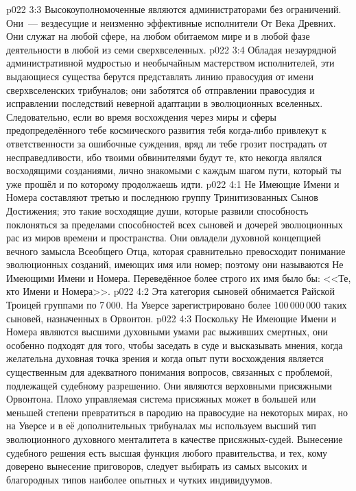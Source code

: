 \vs p022 3:3 Высокоуполномоченные являются администраторами без ограничений. Они~--- вездесущие и неизменно эффективные исполнители От Века Древних. Они служат на любой сфере, на любом обитаемом мире и в любой фазе деятельности в любой из семи сверхвселенных.
\vs p022 3:4 Обладая незаурядной административной мудростью и необычайным мастерством исполнителей, эти выдающиеся существа берутся представлять линию правосудия от имени сверхвселенских трибуналов; они заботятся об отправлении правосудия и исправлении последствий неверной адаптации в эволюционных вселенных. Следовательно, если во время восхождения через миры и сферы предопределённого тебе космического развития тебя когда\hyp{}либо привлекут к ответственности за ошибочные суждения, вряд ли тебе грозит пострадать от несправедливости, ибо твоими обвинителями будут те, кто некогда являлся восходящими созданиями, лично знакомыми с каждым шагом пути, который ты уже прошёл и по которому продолжаешь идти.
\vs p022 4:1 Не Имеющие Имени и Номера составляют третью и последнюю группу Тринитизованных Сынов Достижения; это такие восходящие души, которые развили способность поклоняться за пределами способностей всех сыновей и дочерей эволюционных рас из миров времени и пространства. Они овладели духовной концепцией вечного замысла Всеобщего Отца, которая сравнительно превосходит понимание эволюционных созданий, имеющих имя или номер; поэтому они называются Не Имеющими Имени и Номера. Переведённое более строго их имя было бы: <<Те, кто  Имени и Номера>>.
\vs p022 4:2 Эта категория сыновей обнимается Райской Троицей группами по 7\,000. На Уверсе зарегистрировано более 100\,000\,000 таких сыновей, назначенных в Орвонтон.
\vs p022 4:3 Поскольку Не Имеющие Имени и Номера являются высшими духовными умами рас выживших смертных, они особенно подходят для того, чтобы заседать в суде и высказывать мнения, когда желательна духовная точка зрения и когда опыт пути восхождения является существенным для адекватного понимания вопросов, связанных с проблемой, подлежащей судебному разрешению. Они являются верховными присяжными Орвонтона. Плохо управляемая система присяжных может в большей или меньшей степени превратиться в пародию на правосудие на некоторых мирах, но на Уверсе и в её дополнительных трибуналах мы используем высший тип эволюционного духовного менталитета в качестве присяжных\hyp{}судей. Вынесение судебного решения есть высшая функция любого правительства, и тех, кому доверено вынесение приговоров, следует выбирать из самых высоких и благородных типов наиболее опытных и чутких индивидуумов.
